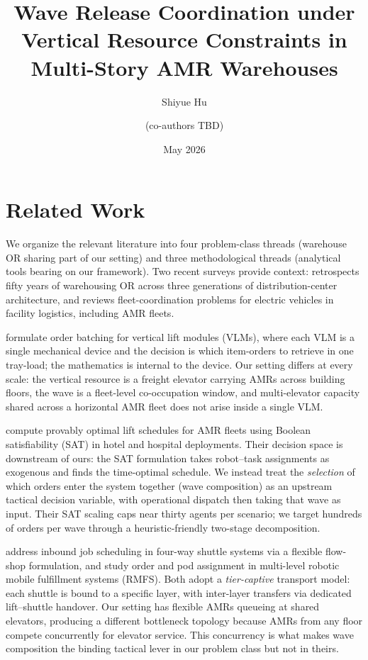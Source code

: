 \documentclass[11pt, a4paper]{article}
\title{Wave Release Coordination under Vertical Resource Constraints in Multi-Story AMR Warehouses}
\author{Shiyue Hu \and (co-authors TBD)}
\date{May 2026}
\begin{document}
\maketitle

\section{Related Work}\label{sec:related}

We organize the relevant literature into four problem-class threads (warehouse OR sharing part of our setting) and three methodological threads (analytical tools bearing on our framework). Two recent surveys provide context: \citet{boysendekoster2025} retrospects fifty years of warehousing OR across three generations of distribution-center architecture, and \citet{boysenschneiderzulj2025} reviews fleet-coordination problems for electric vehicles in facility logistics, including AMR fleets.

\citet{lenoble2018} formulate order batching for vertical lift modules (VLMs), where each VLM is a single mechanical device and the decision is which item-orders to retrieve in one tray-load; the mathematics is internal to the device. Our setting differs at every scale: the vertical resource is a freight elevator carrying AMRs across building floors, the wave is a fleet-level co-occupation window, and multi-elevator capacity shared across a horizontal AMR fleet does not arise inside a single VLM.

\citet{chakravarty2025} compute provably optimal lift schedules for AMR fleets using Boolean satisfiability (SAT) in hotel and hospital deployments. Their decision space is downstream of ours: the SAT formulation takes robot--task assignments as exogenous and finds the time-optimal schedule. We instead treat the \emph{selection} of which orders enter the system together (wave composition) as an upstream tactical decision variable, with operational dispatch then taking that wave as input. Their SAT scaling caps near thirty agents per scenario; we target hundreds of orders per wave through a heuristic-friendly two-stage decomposition.

\citet{wu2024} address inbound job scheduling in four-way shuttle systems via a flexible flow-shop formulation, and \citet{keung2023} study order and pod assignment in multi-level robotic mobile fulfillment systems (RMFS). Both adopt a \emph{tier-captive} transport model: each shuttle is bound to a specific layer, with inter-layer transfers via dedicated lift--shuttle handover. Our setting has flexible AMRs queueing at shared elevators, producing a different bottleneck topology because AMRs from any floor compete concurrently for elevator service. This concurrency is what makes wave composition the binding tactical lever in our problem class but not in theirs.
\end{document}
